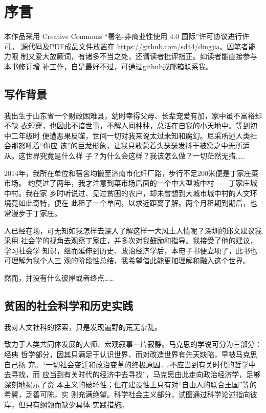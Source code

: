 \chapter{序言}
\label{chap:preface}

本作品采用 Creative Commons “署名-非商业性使用 4.0 国际”许可协议进行许可。
源代码及PDF成品文件放置在 \url{https://github.com/sd44/dingjia}。因笔者能力限
制又爱大放厥词，有诸多不当之处，还请读者批评指正。如读者能直接参与本书修订增
补工作，自是最好不过，可通过github或邮箱联系我。

\section*{写作背景}

我出生于山东省一个财政困难县，幼时幸得父母、长辈宠爱有加，家中虽不富裕却不缺
衣短穿，也因此不谙世事，不解人间种种，总活在自我的小天地中。等到初中二年级时
便遭恶果反噬，世间一切对我来说太过未知和魔幻。尼采所述人类社会那怒吼着“你应
该”的巨龙形象，让我只敢蒙着头瑟瑟发抖于被窝之中无所适从。这世界究竟是什么样
子？为什么会这样？我该怎么做？一切茫然无措……

2014年，我所在单位和宿舍均搬至济南市化纤厂路，步行不足200米便是丁家庄菜市场。
约莫过了两年，我才注意到菜市场后面的一个中大型城中村——丁家庄城中村。我在家
乡时听说过、见过贫困的农户，却未曾想到大城市城中村的人文环境竟如此奇特，便在
此租了一个单间，以求近距离了解。两个月租期到期后，也常漫步于丁家庄。

人已经在场，可无知如我怎样去深入了解这样一大风土人情呢？深圳的邱文建议我采用
社会学的视角去观察丁家庄，并多次对我鼓励和指导。我接受了他的建议，学习社会学
知识，继而延伸到历史、政治经济学后，本电子书便立项了，此书也可理解为我个人三
观的阶段性总结，我希望借此能更加理解和融入这个世界。

然而，并没有什么彼岸或者终点……

\section*{贫困的社会科学和历史实践}

我对人文社科的探索，只是发现遍野的荒芜杂乱。

致力于人类共同体发展的大师、宏观叙事一片寂静。马克思的学说可分为三部分：经典
哲学部分，因其只满足于认识世界、而对改造世界有先天缺陷，早被马克思自己扬
弃。“一切社会变迁和政治变革的终极原因……不应当到有关时代的哲学中去寻找，而
应当到有关时代的经济中去寻找”，马克思由此走向政治经济学，足够深刻地揭示了资
本主义的破坏性；但在建设性上只有对“自由人的联合王国”等的希翼，乏善可陈，实
则充满绝望。科学社会主义部分，试图通过科学论述指向彼岸，但只有纲领而缺少具体
实践措施。


